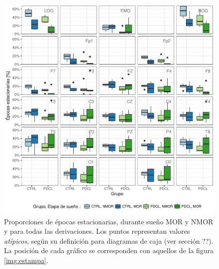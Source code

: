 \begin{figure}
\centering
\includegraphics[width=\linewidth]
{./scripts_graf_res/comparacion_cabeza.pdf}
\caption{Proporciones de épocas estacionarias, durante sueño MOR y NMOR y para todas las derivaciones.
%
Los puntos representan valores \textit{atípicos}, según su definición para diagramas de caja (ver sección ??).
%
La posición de cada gráfico se corresponden con aquellos de la figura \ref{img:estampa}.}
\label{comparacion_verde}
\end{figure}

%

